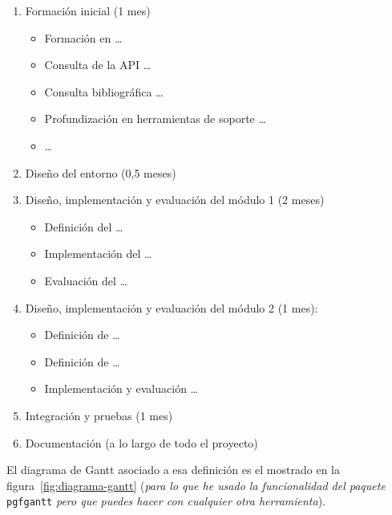 \begin{enumerate}
  
\item Formación inicial (1 mes)
  
  \begin{itemize}
  \item Formación en \ldots
  \item Consulta de la API \ldots
  \item Consulta bibliográfica \ldots
  \item Profundización en herramientas de soporte \ldots
  \item  \ldots
  \end{itemize}

\item Diseño del entorno (0,5 meses)

\item Diseño, implementación y evaluación del módulo 1 (2 meses)
  \begin{itemize}
  \item Definición del  \ldots
  \item Implementación del  \ldots
  \item Evaluación del  \ldots
  \end{itemize}
  
\item Diseño, implementación y evaluación del módulo 2 (1 mes):
  \begin{itemize}
  \item Definición de  \ldots
  \item Definición de  \ldots
  \item Implementación y evaluación  \ldots
  \end{itemize}

\item Integración y pruebas (1 mes)

\item Documentación (a lo largo de todo el proyecto)

\end{enumerate}

El diagrama de Gantt asociado a esa definición es el mostrado en la figura~\ref{fig:diagrama-gantt} (\textit{para lo que he usado la funcionalidad del paquete} \texttt{pgfgantt} \textit{pero que puedes hacer con cualquier otra herramienta}).

